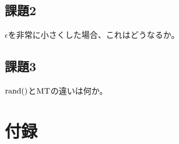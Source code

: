 \documentclass[12pt]{jarticle}
\begin{document}
\subsection{課題2}
\begin{shadebox}
    $\epsilon$を非常に小さくした場合、これはどうなるか。
\end{shadebox}

\clearpage

\subsection{課題3}
\begin{shadebox}
    $\rm{rand()}$と$\rm{MT}$の違いは何か。
\end{shadebox}

\clearpage
\appendix
\section{付録}
\end{document}
